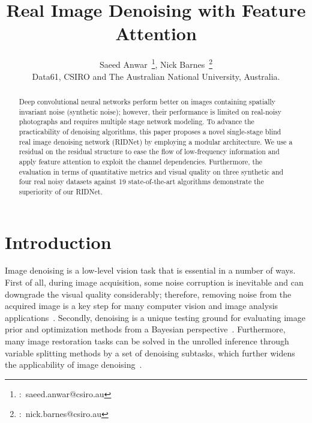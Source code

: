 \documentclass[10pt,twocolumn,letterpaper]{article}
\begin{document}
\title{Real Image Denoising with Feature Attention}
\author{Saeed Anwar~\thanks{\Letter:~saeed.anwar@csiro.au}, Nick Barnes~\thanks{\Letter:~nick.barnes@csiro.au}\\
Data61, CSIRO and The Australian National University, Australia.}

\def\NB#1{{\color{red} {{#1}}}} \def\SA#1{{\color{blue} {{#1}}}} \maketitle



\begin{abstract}
Deep convolutional neural networks perform better on images containing spatially invariant noise (synthetic noise); however, their performance is limited on real-noisy photographs and requires multiple stage network modeling. To advance the practicability of denoising algorithms, this paper proposes a novel single-stage blind real image denoising network (RIDNet) by employing a modular architecture. We use a residual on the residual structure to ease the flow of low-frequency information and apply feature attention to exploit the channel dependencies. Furthermore, the evaluation in terms of quantitative metrics and visual quality on three synthetic and four real noisy datasets against 19 state-of-the-art algorithms demonstrate the superiority of our RIDNet.
\end{abstract}

\section{Introduction}

Image denoising is a low-level vision task that is essential in a number of ways. First of all, during image acquisition, some noise corruption is inevitable and can downgrade the visual quality considerably; therefore, removing noise from the acquired image is a key step for many computer vision and image analysis applications~\cite{gonzalez1977DIP}. Secondly, denoising is a unique testing ground for evaluating image prior and optimization methods from a Bayesian perspective~\cite{Gu2014WNN,Zoran2011EPLL}. Furthermore, many image restoration tasks can be solved in the unrolled inference through variable splitting methods by a set of denoising subtasks, which further widens the applicability of image denoising~\cite{afonso2010fast,heide2014flexisp,romano2017little,zhang2017IRCNN}.
\end{document}
